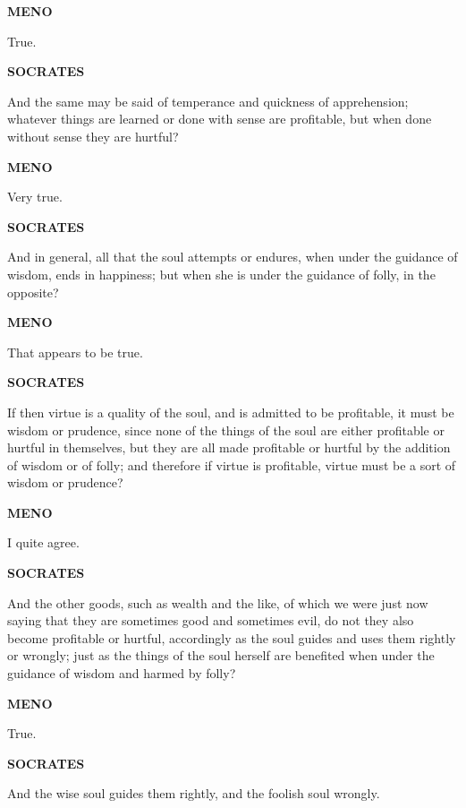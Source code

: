\documentclass[11pt,letter]{article}
\begin{document}
\par \textbf{MENO}
\par   True.

\par \textbf{SOCRATES}
\par   And the same may be said of temperance and quickness of apprehension; whatever things are learned or done with sense are profitable, but when done without sense they are hurtful?

\par \textbf{MENO}
\par   Very true.

\par \textbf{SOCRATES}
\par   And in general, all that the soul attempts or endures, when under the guidance of wisdom, ends in happiness; but when she is under the guidance of folly, in the opposite?

\par \textbf{MENO}
\par   That appears to be true.

\par \textbf{SOCRATES}
\par   If then virtue is a quality of the soul, and is admitted to be profitable, it must be wisdom or prudence, since none of the things of the soul are either profitable or hurtful in themselves, but they are all made profitable or hurtful by the addition of wisdom or of folly; and therefore if virtue is profitable, virtue must be a sort of wisdom or prudence?

\par \textbf{MENO}
\par   I quite agree.

\par \textbf{SOCRATES}
\par   And the other goods, such as wealth and the like, of which we were just now saying that they are sometimes good and sometimes evil, do not they also become profitable or hurtful, accordingly as the soul guides and uses them rightly or wrongly; just as the things of the soul herself are benefited when under the guidance of wisdom and harmed by folly?

\par \textbf{MENO}
\par   True.

\par \textbf{SOCRATES}
\par   And the wise soul guides them rightly, and the foolish soul wrongly.
\end{document}
